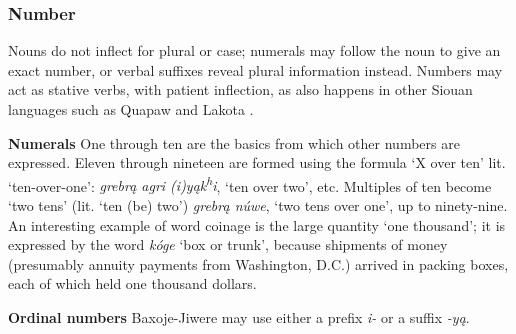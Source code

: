 \documentclass[output=paper]{LSP/langsci}
\begin{document}
\subsubsection{Number}  Nouns do not inflect for plural or case; numerals may follow the noun to give an exact number, or verbal suffixes reveal plural information instead.  Numbers may act as stative verbs, with  patient inflection, as also happens in other Siouan languages such as Quapaw \citep[481]{Rankin2008} and Lakota \citep[708]{Ullrich2008}.  

\vspace{1em}
\textbf{Numerals}  One through ten are the basics from which other numbers are expressed. Eleven through nineteen are formed using the formula `X over ten' {lit. `ten-over-one'}: \textit{grebr\k{a} agri (i)y\k{a}k\textsuperscript{h}i}, `ten over two', etc. Multiples of ten become `two tens' (lit. `ten (be) two') \textit{grebr\k{a} núwe}, `two tens over one',  up to ninety-nine.  An interesting example of word coinage is the large quantity `one thousand'; it is expressed by the word \textit{k\'oge} `box or trunk', because shipments of money (presumably annuity payments from Washington, D.C.) arrived in packing boxes, each of which held one thousand dollars.
											
\vspace{1em}
\textbf{Ordinal numbers}  Baxoje-Jiwere may use either a prefix \textit{i-} or a suffix \textit{-y\k{a}}.
\end{document}
